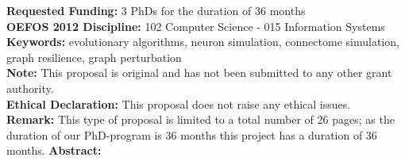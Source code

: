 \documentclass[a4paper,11pt]{article}
\begin{document}
%
{\bf Requested Funding:} 3 PhDs for the duration of 36 months
\\[0,3cm]
%
%
{\bf OEFOS 2012 Discipline:} 102 Computer Science - 015  Information Systems 
\\[0,2cm]
{\bf Keywords:} evolutionary algorithms, neuron simulation, connectome simulation, graph resilience, graph perturbation %
\\[0,2cm]
{\bf Note:} This proposal is original and has not been submitted to any other grant authority.
\\[0,2cm]
{\bf Ethical Declaration:} This proposal does not raise any ethical issues.
\\[0,2cm]
{\bf Remark:} This type of proposal is limited to a total number of 26 pages; as the duration of our PhD-program is 36 months this project has a duration of 36 months.
\newpage
%
{\bf Abstract:}
\end{document}

